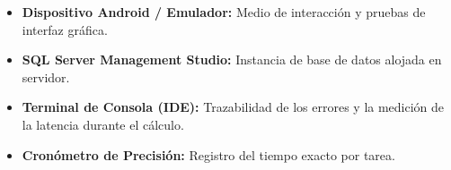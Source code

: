 \begin{itemize}
    \item \textbf{Dispositivo Android / Emulador:} Medio de interacción y pruebas de interfaz gráfica.
    \item \textbf{SQL Server Management Studio:} Instancia de base de datos alojada en servidor.
    \item \textbf{Terminal de Consola (IDE):} Trazabilidad de los errores y la medición de la latencia durante el cálculo.
    \item \textbf{Cronómetro de Precisión:} Registro del tiempo exacto por tarea.
\end{itemize}
